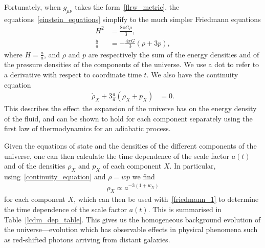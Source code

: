     Fortunately, when $g_{\mu\nu}$ takes the form~\eqref{flrw_metric},
    the equations~\eqref{einstein_equations} simplify to the much simpler Friedmann equations
    \begin{align}\label{friedmann_1}
        H^2 &= \frac{8\pi G \rho}{3},\\
        \frac{\ddot{a}}{a} &= -\frac{4\pi G}{3}\left(\rho+3p\right),
    \end{align}
    where $H=\frac{\dot{a}}{a}$, and $\rho$ and $p$ are respectively the sum of the
    energy densities and of the pressure densities of the
    components of the universe.
    We use a dot to refer to a derivative with respect to coordinate time $t$.
    We also have the continuity equation
    \begin{align}\label{continuity_equation}
        \dot{\rho}_X + 3\frac{\dot{a}}{a}\left(\rho_X+p_X\right) &= 0.
    \end{align}
    This describes
    the effect the expansion of the universe has on the energy density of the fluid,
    and can be shown to hold for each component
    separately using the first law of thermodynamics for an adiabatic process.

    Given the equations of state and the densities of the different
    components of the universe, one can then calculate the time dependence of the
    scale factor $a(t)$ and of the densities $\rho_X$ and $p_X$ of each component $X$.
    In particular, using~\eqref{continuity_equation} and $\rho=wp$
    we find
    \begin{align}\label{rho_a_dep_X}
        \rho_X\propto a^{-3(1+w_X)}
    \end{align}
    for each component $X$, which can then be used with~\eqref{friedmann_1}
    to determine the time dependence of the scale factor
    $a(t)$. This is summarised in Table~\ref{lcdm_dep_table}.
    This gives us the homogeneous background evolution of the universe---evolution
    which has observable effects in physical phenomena
    such as red-shifted photons arriving from distant galaxies.


